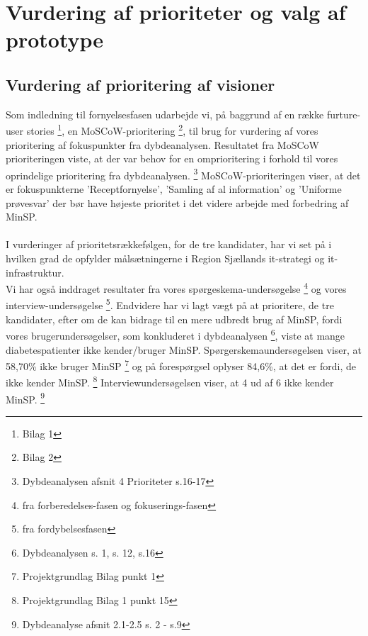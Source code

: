 %
% 
%
\section{Vurdering af prioriteter og valg af prototype}
\subsection{Vurdering af prioritering af visioner}
Som indledning til fornyelsesfasen udarbejde vi, på baggrund af en række furture-user stories \footnote{Bilag 1}, en MoSCoW-prioritering \footnote{Bilag 2}, til brug for vurdering af vores prioritering af fokuspunkter fra dybdeanalysen.
Resultatet fra MoSCoW prioriteringen viste, at der var behov for en omprioritering i forhold til vores oprindelige prioritering fra dybdeanalysen. \footnote{Dybdeanalysen afsnit 4 Prioriteter s.16-17}
%
MoSCoW-prioriteringen viser, at det er fokuspunkterne 'Receptfornyelse', 'Samling af al information' og 'Uniforme prøvesvar' der bør have højeste prioritet i det videre arbejde med forbedring af MinSP.\\
\\
I vurderinger af prioritetsrækkefølgen, for de tre kandidater, har vi set på i hvilken grad de opfylder målsætningerne i Region Sjællands it-strategi og it-infrastruktur. \\
Vi har også inddraget resultater fra vores spørgeskema-undersøgelse \footnote{fra forberedelses-fasen og fokuserings-fasen} og vores interview-undersøgelse \footnote{fra fordybelsesfasen}.
Endvidere har vi lagt vægt på at prioritere, de tre kandidater, efter om de kan bidrage til en mere udbredt brug af MinSP, fordi vores brugerundersøgelser, som konkluderet i dybdeanalysen \footnote{Dybdeanalysen s. 1, s. 12, s.16}, viste at mange diabetespatienter ikke kender/bruger MinSP. 
Spørgerskemaundersøgelsen viser, at 58,70\% ikke bruger MinSP \footnote{Projektgrundlag Bilag punkt 1} og på forespørgsel oplyser 84,6\%, at det er fordi, de ikke kender MinSP. \footnote{Projektgrundlag Bilag 1 punkt 15} Interviewundersøgelsen viser, at 4 ud af 6 ikke kender MinSP. \footnote{Dybdeanalyse afsnit 2.1-2.5 s. 2 - s.9}\\
